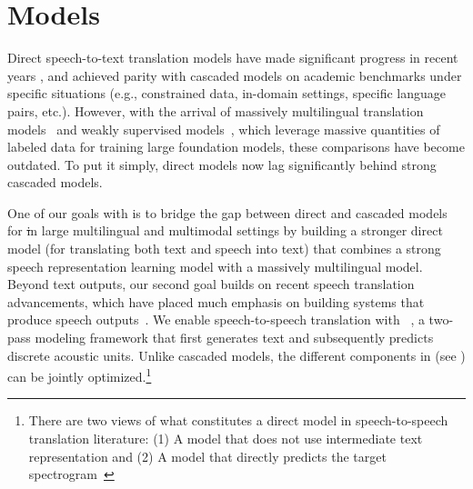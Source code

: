 \FloatBarrier
\newpage

\section{\mfourt Models}
\label{sec:appendix:modeling}



Direct speech-to-text translation models 
have made significant progress in recent years \citep{Berard2016ListenAT,Weiss2017SequencetoSequenceMC,di2019must,agrawal-etal-2023-findings}, and achieved parity with cascaded models on academic benchmarks under specific situations (e.g., constrained data, in-domain settings, specific language pairs, etc.). However, with the arrival of massively multilingual translation models~\citep{nllb2022, siddhant2022towards, m2m100} and weakly supervised \asr models~\citep{whisper, google_usm, mms}, which leverage massive quantities of labeled data for training large foundation models, these comparisons have become outdated. To put it simply,  direct models now lag significantly behind strong cascaded models.

One of our goals with \mfourt is to bridge the gap between direct and cascaded models for \st in large multilingual and multimodal
settings by building a stronger direct \xt model (for translating both text and speech into text) that combines 
a strong speech representation learning model with a massively multilingual \mt model.
Beyond text outputs, our second goal builds on recent speech translation advancements, which have placed much emphasis on building systems that produce speech outputs~\citep{jia:interspeech:2019, lee-etal-2022-direct,unity}.
We enable speech-to-speech translation with \unity~\citep{unity}, a two-pass modeling framework that first generates text and subsequently predicts discrete acoustic units. 
Unlike cascaded models,
the different components in \unity (see ) can be jointly optimized.\footnote{There are two views of what constitutes a direct model in speech-to-speech translation literature: (1) A model that does not use intermediate text representation \citep{lee-etal-2022-direct} and (2) A model that directly predicts the target spectrogram~\citep{pmlr-v162-jia22b}}

